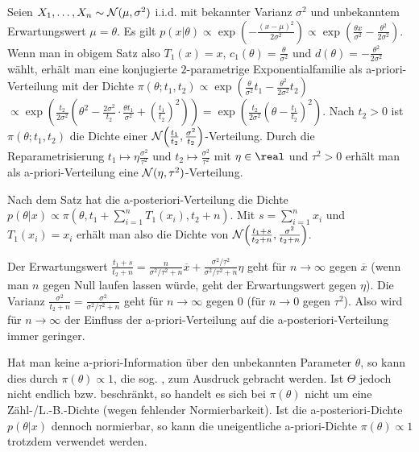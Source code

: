 \linie
\pagebreak

\begin{Bsp}
    Seien $X_1, \dotsc, X_n \sim \mathcal{N}(\mu, \sigma^2)$ i.i.d. mit bekannter Varianz $\sigma^2$
    und unbekanntem Erwartungswert $\mu = \theta$.
    Es gilt $p(x|\theta) \propto \exp\!\left(-\frac{(x - \mu)^2}{2\sigma^2}\right) \propto
    \exp\!\left(\frac{\theta x}{\sigma^2} - \frac{\theta^2}{2\sigma^2}\right)$.
    Wenn man in obigem Satz also $T_1(x) = x$, $c_1(\theta) = \frac{\theta}{\sigma^2}$ und
    $d(\theta) = -\frac{\theta^2}{2\sigma^2}$ wählt,
    erhält man eine konjugierte $2$-parametrige Exponentialfamilie als a-priori-Verteilung mit der
    Dichte $\pi(\theta; t_1, t_2) \propto
    \exp\!\left(\frac{\theta}{\sigma^2} t_1 - \frac{\theta^2}{2\sigma^2} t_2\right)$\\
    $\propto \exp\!\left(\frac{t_2}{2\sigma^2} \left(\theta^2 - \frac{2\sigma^2}{t_2} \cdot
    \frac{\theta t_1}{\sigma^2} + \left(\frac{t_1}{t_2}\right)^2\right)\right)
    = \exp\!\left(\frac{t_2}{2\sigma^2} \left(\theta - \frac{t_1}{t_2}\right)^2\right)$.
    Nach $t_2 > 0$ ist $\pi(\theta; t_1, t_2)$ die Dichte einer
    $\mathcal{N}\!\left(\frac{t_1}{t_2}, \frac{\sigma^2}{t_2}\right)$-Verteilung.
    Durch die Reparametrisierung $t_1 \mapsto \eta \frac{\sigma^2}{\tau^2}$ und
    $t_2 \mapsto \frac{\sigma^2}{\tau^2}$ mit $\eta \in \real$ und $\tau^2 > 0$ erhält man
    als a-priori-Verteilung eine $\mathcal{N}(\eta, \tau^2)$-Verteilung.
    
    Nach dem Satz hat die a-posteriori-Verteilung die Dichte
    $p(\theta|x) \propto \pi(\theta, t_1 + \sum_{i=1}^n T_1(x_i), t_2 + n)$.
    Mit $s = \sum_{i=1}^n x_i$ und $T_1(x_i) = x_i$ erhält man also die Dichte von
    $\mathcal{N}\!\left(\frac{t_1 + s}{t_2 + n}, \frac{\sigma^2}{t_2 + n}\right)$.
    
    Der Erwartungswert $\frac{t_1 + s}{t_2 + n} =
    \frac{n}{\sigma^2/\tau^2 + n} \overline{x} +
    \frac{\sigma^2/\tau^2}{\sigma^2/\tau^2+n} \eta$ geht für $n \to \infty$ gegen
    $\overline{x}$ (wenn man $n$ gegen Null laufen lassen würde, geht der Erwartungswert gegen
    $\eta$).
    Die Varianz $\frac{\sigma^2}{t_2 + n} = \frac{\sigma^2}{\sigma^2/\tau^2 + n}$ geht für
    $n \to \infty$ gegen $0$ (für $n \to 0$ gegen $\tau^2$).
    Also wird für $n \to \infty$ der Einfluss der a-priori-Verteilung auf die
    a-posteriori-Verteilung immer geringer.
\end{Bsp}

\begin{Bem}
    Hat man keine a-priori-Information über den unbekannten Parameter $\theta$,
    so kann dies durch $\pi(\theta) \propto 1$, die sog.
    , zum Ausdruck gebracht werden.
    Ist $\Theta$ jedoch nicht endlich bzw. beschränkt, so handelt es sich bei $\pi(\theta)$ nicht
    um eine Zähl-/L.-B.-Dichte (wegen fehlender Normierbarkeit).
    Ist die a-posteriori-Dichte $p(\theta|x)$ dennoch normierbar, so kann die uneigentliche
    a-priori-Dichte $\pi(\theta) \propto 1$ trotzdem verwendet werden.
\end{Bem}

\pagebreak
